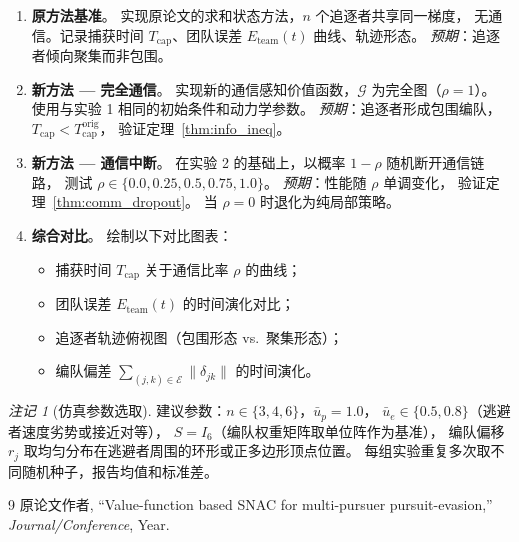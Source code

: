 \documentclass[a4paper,11pt]{article}
\theoremstyle{plain}
\theoremstyle{definition}
\theoremstyle{remark}
\newtheorem{remark}[theorem]{注记}
\newcommand{\cG}{\mathcal{G}}
\newcommand{\cE}{\mathcal{E}}
\newcommand{\norm}[1]{\lVert #1 \rVert}
\begin{document}
\begin{enumerate}[label=\textbf{实验 \arabic*}:, leftmargin=4em]
  \item \textbf{原方法基准}。
    实现原论文的求和状态方法，$n$ 个追逐者共享同一梯度，
    无通信。记录捕获时间 $T_{\text{cap}}$、团队误差
    $E_{\text{team}}(t)$ 曲线、轨迹形态。
    \emph{预期}：追逐者倾向聚集而非包围。

  \item \textbf{新方法 --- 完全通信}。
    实现新的通信感知价值函数，$\cG$ 为完全图（$\rho = 1$）。
    使用与实验 1 相同的初始条件和动力学参数。
    \emph{预期}：追逐者形成包围编队，
    $T_{\text{cap}} < T_{\text{cap}}^{\text{orig}}$，
    验证定理~\ref{thm:info_ineq}。

  \item \textbf{新方法 --- 通信中断}。
    在实验 2 的基础上，以概率 $1-\rho$ 随机断开通信链路，
    测试 $\rho \in \{0.0, 0.25, 0.5, 0.75, 1.0\}$。
    \emph{预期}：性能随 $\rho$ 单调变化，
    验证定理~\ref{thm:comm_dropout}。
    当 $\rho = 0$ 时退化为纯局部策略。

  \item \textbf{综合对比}。
    绘制以下对比图表：
    \begin{itemize}
      \item 捕获时间 $T_{\text{cap}}$ 关于通信比率 $\rho$ 的曲线；
      \item 团队误差 $E_{\text{team}}(t)$ 的时间演化对比；
      \item 追逐者轨迹俯视图（包围形态 vs.\ 聚集形态）；
      \item 编队偏差 $\sum_{(j,k)\in\cE} \norm{\delta_{jk}}$ 的时间演化。
    \end{itemize}
\end{enumerate}

\begin{remark}[仿真参数选取]\label{rmk:sim_params}
  建议参数：$n \in \{3, 4, 6\}$，$\bar{u}_p = 1.0$，
  $\bar{u}_e \in \{0.5, 0.8\}$（逃避者速度劣势或接近对等），
  $S = I_6$（编队权重矩阵取单位阵作为基准），
  编队偏移 $r_j$ 取均匀分布在逃避者周围的环形或正多边形顶点位置。
  每组实验重复多次取不同随机种子，报告均值和标准差。
\end{remark}

\begin{thebibliography}{9}
    原论文作者,
    ``Value-function based SNAC for multi-pursuer pursuit-evasion,''
    \emph{Journal/Conference}, Year.
\end{thebibliography}
\end{document}
